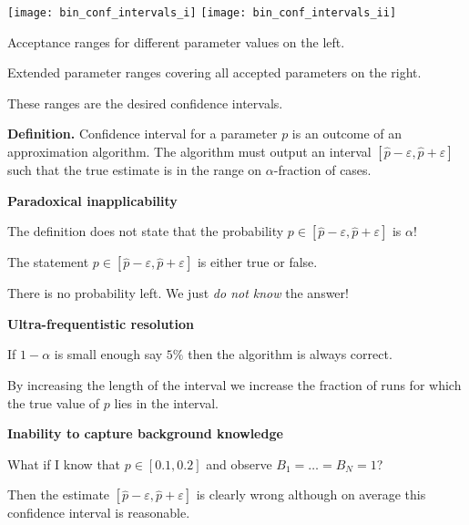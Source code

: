 \documentclass[landscape,footrule]{foils}
\begin{document}
\enlargethispage{0.5cm}
\centerline{
\texttt{[image: bin\_conf\_intervals\_i]}
\texttt{[image: bin\_conf\_intervals\_ii]}}
\begin{triangles}
\item Acceptance ranges for different parameter values on the left.
\item Extended parameter ranges covering all accepted parameters on the right.
\item These ranges are the desired confidence intervals.
\end{triangles}



\textbf{Definition.}
Confidence interval for a parameter $p$ is an outcome of an approximation algorithm. The algorithm  must output an interval $[\hat{p}-\varepsilon,\hat{p}+\varepsilon]$ such that the true estimate is in the range on $\alpha$-fraction of cases.
\vspace*{2ex}

\textbf{Paradoxical inapplicability}

The definition does not state that the probability $p\in[\hat{p}-\varepsilon,\hat{p}+\varepsilon]$ is $\alpha$!
\begin{triangles}
\item The statement $p\in[\hat{p}-\varepsilon,\hat{p}+\varepsilon]$ is either true or false.
\item There is no probability left. We just \emph{do not know} the answer!
\end{triangles} 
\vspace*{3ex}

\textbf{Ultra-frequentistic resolution}
\begin{triangles}
\item  If $1-\alpha$ is small enough say $5\%$ then the algorithm is always correct. 
\end{triangles}




By increasing the length of the interval we increase the fraction of runs for which the true value of $p$ lies in the interval.



\textbf{Inability to capture background knowledge}
\begin{triangles}
\item What if I know that $p\in[0.1,0.2]$ and observe $B_1=\ldots=B_N=1$?
\item Then the estimate $[\hat{p}-\varepsilon,\hat{p}+\varepsilon]$  is clearly wrong although on average this confidence interval is reasonable.
\end{triangles}
\vspace*{2cm}
\end{document}
